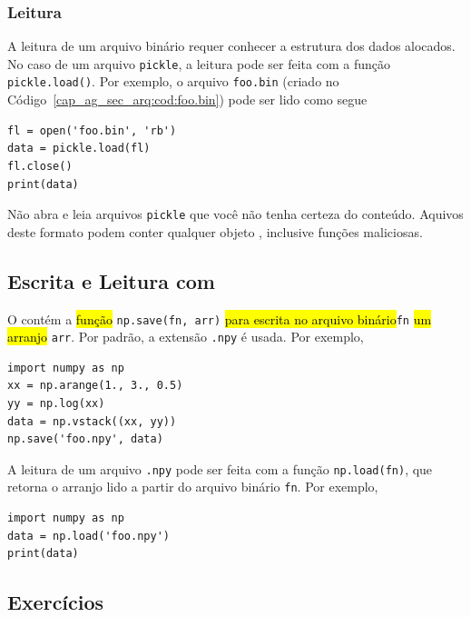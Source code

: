 \subsubsection{Leitura}

A leitura de um arquivo binário requer conhecer a estrutura dos dados alocados. No caso de um arquivo \lstinline+pickle+, a leitura pode ser feita com a função \lstinline+pickle.load()+. Por exemplo, o arquivo \lstinline+foo.bin+ (criado no Código~\ref{cap_ag_sec_arq:cod:foo.bin}) pode ser lido como segue

\begin{lstlisting}
fl = open('foo.bin', 'rb')
data = pickle.load(fl)
fl.close()
print(data)
\end{lstlisting}

\begin{obs}
  Não abra e leia arquivos \lstinline+pickle+ que você não tenha certeza do conteúdo. Aquivos deste formato podem conter qualquer objeto {\python}, inclusive funções maliciosas.
\end{obs}

\subsection{Escrita e Leitura com {\numpy}}

O {\numpy} contém a \hl{função} \lstinline+np.save(fn, arr)+ \hl{para escrita no arquivo binário}\lstinline+fn+ \hl{um arranjo} \lstinline+arr+. Por padrão, a extensão \lstinline+.npy+ é usada. Por exemplo,


\begin{lstlisting}
import numpy as np
xx = np.arange(1., 3., 0.5)
yy = np.log(xx)
data = np.vstack((xx, yy))
np.save('foo.npy', data)
\end{lstlisting}

A leitura de um arquivo \lstinline+.npy+ pode ser feita com a função \lstinline+np.load(fn)+, que retorna o arranjo lido a partir do arquivo binário \lstinline+fn+. Por exemplo,

\begin{lstlisting}
import numpy as np
data = np.load('foo.npy')
print(data)
\end{lstlisting}

\subsection{Exercícios}

